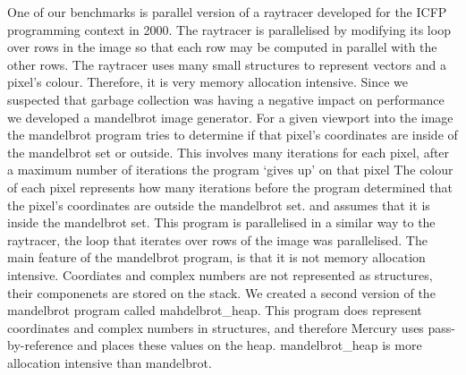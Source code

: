 One of our benchmarks is parallel version of a raytracer developed for the
ICFP programming context in 2000.
The raytracer is parallelised by modifying its loop over rows in the image
so that each row may be computed in parallel with the other rows.
The raytracer uses many small structures to represent vectors and a pixel's
colour.
Therefore,
it is very memory allocation intensive.
Since we suspected that garbage collection was having a negative impact on
performance we developed a mandelbrot image generator.
For a given viewport into the image the mandelbrot program
tries to determine if that pixel's coordinates are inside of the mandelbrot
set or outside.
This involves many iterations for each pixel,
after a maximum number of iterations the program `gives up' on that pixel
The colour of each pixel represents how many iterations before the program
determined that the pixel's coordinates are outside the mandelbrot set.
and assumes that it is inside the mandelbrot set.
This program is parallelised in a similar way to the raytracer,
the loop that iterates over rows of the image was parallelised.
The main feature of the mandelbrot program,
is that it is not memory allocation intensive.
Coordiates and complex numbers are not represented as structures,
their componenets are stored on the stack.
We created a second version of the mandelbrot program called
mahdelbrot\_heap.
This program does represent coordinates and complex numbers in structures,
and therefore Mercury uses pass-by-reference and places these values on the
heap.
mandelbrot\_heap is more allocation intensive than mandelbrot.

